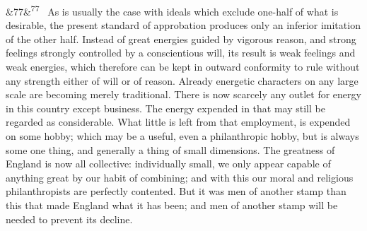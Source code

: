 \documentclass[12pt]{article}
\newcommand{\para}[1][]{\par\noindent\ifx&#1&\else\textsuperscript{\footnotesize #1}~\fi}
\begin{document}
\para[77] As is usually the case with ideals which exclude one-half of what is desirable, the present standard of approbation produces only an inferior imitation of the other half. Instead of great energies guided by vigorous reason, and strong feelings strongly controlled by a conscientious will, its result is weak feelings and weak energies, which therefore can be kept in outward conformity to rule without any strength either of will or of reason. Already energetic characters on any large scale are becoming merely traditional. There is now scarcely any outlet for energy in this country except business. The energy expended in that may still be regarded as considerable. What little is left from that employment, is expended on some hobby; which may be a useful, even a philanthropic hobby, but is always some one thing, and generally a thing of small dimensions. The greatness of England is now all collective: individually small, we only appear capable of anything great by our habit of combining; and with this our moral and religious philanthropists are perfectly contented. But it was men of another stamp than this that made England what it has been; and men of another stamp will be needed to prevent its decline.
\end{document}
